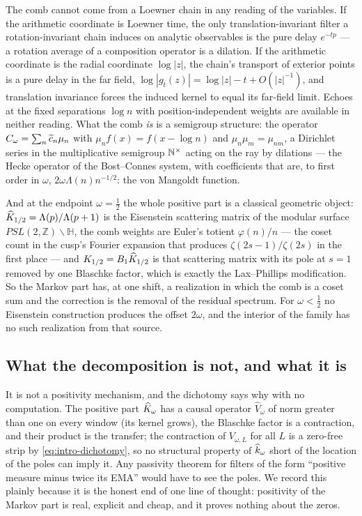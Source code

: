 The comb cannot come from a Loewner chain in any reading of the variables. If
the arithmetic coordinate is Loewner time, the only translation-invariant
filter a rotation-invariant chain induces on analytic observables is the pure
delay $e^{-tp}$ --- a rotation average of a composition operator is a dilation.
If the arithmetic coordinate is the radial coordinate $\log|z|$, the chain's
transport of exterior points is a pure delay in the far field,
$\log|g_t(z)|=\log|z|-t+O(|z|^{-1})$, and translation invariance forces the
induced kernel to equal its far-field limit. Echoes at the fixed separations
$\log n$ with position-independent weights are available in neither reading.
What the comb \emph{is} is a semigroup structure: the operator
$C_\omega=\sum_n\widetilde c_n\mu_n$ with $\mu_nf(x)=f(x-\log n)$ and
$\mu_n\mu_m=\mu_{nm}$, a Dirichlet series in the multiplicative semigroup
$\mathbb N^\times$ acting on the ray by dilations --- the Hecke operator of the
Bost--Connes system, with coefficients that are, to first order in $\omega$,
$2\omega\Lambda(n)n^{-1/2}$: the von Mangoldt function.

And at the endpoint $\omega=\frac12$ the whole positive part is a classical
geometric object: $\widehat K_{1/2}=\Lambda(p)/\Lambda(p+1)$ is the Eisenstein
scattering matrix of the modular surface $PSL(2,\mathbb Z)\backslash\mathbb H$,
the comb weights are Euler's totient $\varphi(n)/n$ --- the coset count in the
cusp's Fourier expansion that produces $\zeta(2s-1)/\zeta(2s)$ in the first
place --- and $K_{1/2}=B_1\widehat K_{1/2}$ is that scattering matrix with its pole at
$s=1$ removed by one Blaschke factor, which is exactly the Lax--Phillips
modification. So the Markov part has, at one shift, a realization in which the
comb is a coset sum and the correction is the removal of the residual
spectrum. For $\omega<\frac12$ no Eisenstein construction produces the offset
$2\omega$, and the interior of the family has no such realization from that
source.

\subsection{What the decomposition is not, and what it is}

It is not a positivity mechanism, and the dichotomy says why with no
computation. The positive part $\widehat K_\omega$ has a causal operator $\widehat
V_\omega$ of norm greater than one on every window (its kernel grows), the
Blaschke factor is a contraction, and their product is the transfer; the
contraction of $V_{\omega,L}$ for all $L$ is a zero-free strip by
\eqref{eq:intro-dichotomy}, so no structural property of $\widehat k_\omega$ short of
the location of the poles can imply it. Any passivity theorem for filters of
the form ``positive measure minus twice its EMA'' would have to see the poles.
We record this plainly because it is the honest end of one line of thought:
positivity of the Markov part is real, explicit and cheap, and it proves
nothing about the zeros.

